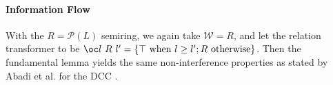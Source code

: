 \vspace{-0.6em}

\paragraph{Information Flow} With the $R = \mathcal{P}(L)$ semiring,
we again take $\mathcal{W} = R$, and let the relation transformer to
be
$\oc l~R~l' = \{\top~\textrm{when }l \geq l'; R~\textrm{otherwise}\}$.
Then the fundamental lemma yields the same non-interference properties
as stated by Abadi et al. for the DCC \cite{abadi99core}.


